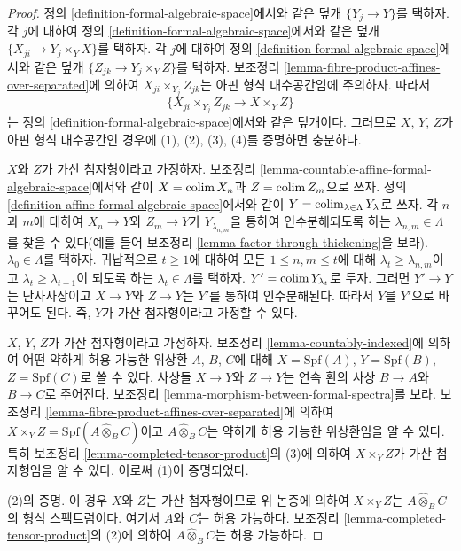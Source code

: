 \begin{proof}
정의 \ref{definition-formal-algebraic-space}에서와 같은 덮개
$\{Y_j \to Y\}$를 택하자. 각 $j$에 대하여 정의
\ref{definition-formal-algebraic-space}에서와 같은 덮개
$\{X_{ji} \to Y_j \times_Y X\}$를 택하자. 각 $j$에 대하여 정의
\ref{definition-formal-algebraic-space}에서와 같은 덮개
$\{Z_{jk} \to Y_j \times_Y Z\}$를 택하자. 보조정리
\ref{lemma-fibre-product-affines-over-separated}에 의하여
$X_{ji} \times_{Y_j} Z_{jk}$는 아핀 형식 대수공간임에 주의하자.
따라서
$$
\{X_{ji} \times_{Y_j} Z_{jk} \to X \times_Y Z\}
$$
는 정의 \ref{definition-formal-algebraic-space}에서와 같은 덮개이다.
그러므로 $X$, $Y$, $Z$가 아핀 형식 대수공간인 경우에 (1), (2),
(3), (4)를 증명하면 충분하다. %

\medskip\noindent
$X$와 $Z$가 가산 첨자형이라고 가정하자. 보조정리
\ref{lemma-countable-affine-formal-algebraic-space}에서와 같이
$X = \mathop{\mathrm{colim}}\nolimits X_n$과 $Z = \mathop{\mathrm{colim}}\nolimits Z_m$으로 쓰자. 정의
\ref{definition-affine-formal-algebraic-space}에서와 같이
$Y = \mathop{\mathrm{colim}}\nolimits_{\lambda \in \Lambda} Y_\lambda$로 쓰자. 각 $n$과
$m$에 대하여 $X_n \to Y$와 $Z_m \to Y$가
$Y_{\lambda_{n, m}}$을 통하여 인수분해되도록 하는
$\lambda_{n, m} \in \Lambda$를 찾을 수 있다(예를 들어 보조정리
\ref{lemma-factor-through-thickening}을 보라).
$\lambda_0 \in \Lambda$를 택하자. 귀납적으로 $t \geq 1$에 대하여
모든 $1 \leq n, m \leq t$에 대해
$\lambda_t \geq \lambda_{n, m}$이고
$\lambda_t \geq \lambda_{t - 1}$이 되도록 하는
$\lambda_t \in \Lambda$를 택하자. $Y' = \mathop{\mathrm{colim}}\nolimits Y_{\lambda_t}$로
두자. 그러면 $Y' \to Y$는 단사사상이고 $X \to Y$와 $Z \to Y$는
$Y'$를 통하여 인수분해된다. 따라서 $Y$를 $Y'$으로 바꾸어도 된다.
즉, $Y$가 가산 첨자형이라고 가정할 수 있다.

\medskip\noindent
$X$, $Y$, $Z$가 가산 첨자형이라고 가정하자. 보조정리
\ref{lemma-countably-indexed}에 의하여 어떤 약하게 허용 가능한
위상환 $A$, $B$, $C$에 대해
$X = \text{Spf}(A)$, $Y = \text{Spf}(B)$,
$Z = \text{Spf}(C)$로 쓸 수 있다. 사상들 $X \to Y$와
$Z \to Y$는 연속 환의 사상 $B \to A$와 $B \to C$로 주어진다.
보조정리 \ref{lemma-morphism-between-formal-spectra}를 보라. %
보조정리 \ref{lemma-fibre-product-affines-over-separated}에 의하여
$X \times_Y Z = \text{Spf}(A \widehat{\otimes}_B C)$이고
$A \widehat{\otimes}_B C$는 약하게 허용 가능한 위상환임을 알 수
있다. 특히 보조정리 \ref{lemma-completed-tensor-product}의 (3)에
의하여 $X \times_Y Z$가 가산 첨자형임을 알 수 있다.
이로써 (1)이 증명되었다.

\medskip\noindent
(2)의 증명. 이 경우 $X$와 $Z$는 가산 첨자형이므로 위 논증에 의하여
$X \times_Y Z$는 $A \widehat{\otimes}_B C$의 형식 스펙트럼이다.
여기서 $A$와 $C$는 허용 가능하다. 보조정리
\ref{lemma-completed-tensor-product}의 (2)에 의하여
$A \widehat{\otimes}_B C$는 허용 가능하다.


\end{proof}
